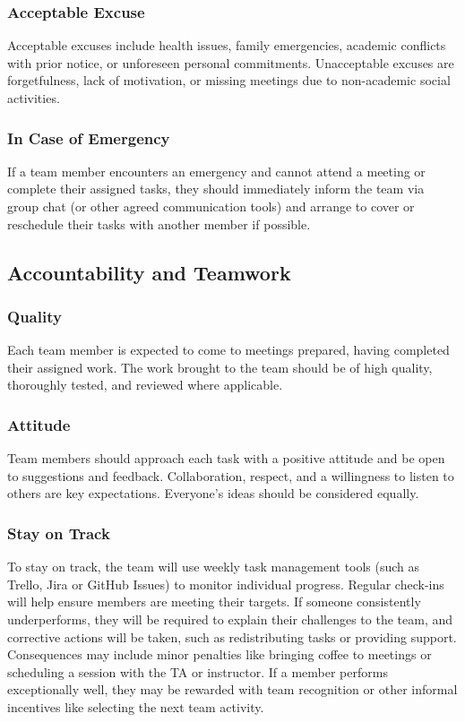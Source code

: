 \documentclass{article}
\begin{document}
\subsubsection*{Acceptable Excuse}

Acceptable excuses include health issues, family emergencies, academic conflicts with prior notice, or unforeseen personal commitments. Unacceptable excuses are forgetfulness, lack of motivation, or missing meetings due to non-academic social activities.

\subsubsection*{In Case of Emergency}

If a team member encounters an emergency and cannot attend a meeting or complete their assigned tasks, they should immediately inform the team via group chat (or other agreed communication tools) and arrange to cover or reschedule their tasks with another member if possible.

\subsection*{Accountability and Teamwork}

\subsubsection*{Quality}

Each team member is expected to come to meetings prepared, having completed their assigned work. The work brought to the team should be of high quality, thoroughly tested, and reviewed where applicable.

\subsubsection*{Attitude}

Team members should approach each task with a positive attitude and be open to suggestions and feedback. Collaboration, respect, and a willingness to listen to others are key expectations. Everyone’s ideas should be considered equally.

\subsubsection*{Stay on Track}

To stay on track, the team will use weekly task management tools (such as Trello, Jira or GitHub Issues) to monitor individual progress. Regular check-ins will help ensure members are meeting their targets. If someone consistently underperforms, they will be required to explain their challenges to the team, and corrective actions will be taken, such as redistributing tasks or providing support. Consequences may include minor penalties like bringing coffee to meetings or scheduling a session with the TA or instructor. If a member performs exceptionally well, they may be rewarded with team recognition or other informal incentives like selecting the next team activity.
\end{document}
